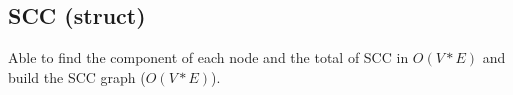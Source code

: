 \subsection{SCC (struct)}

Able to find the component of each node and the total of SCC in $O(V*E)$ and build the SCC graph ($O(V*E)$).

